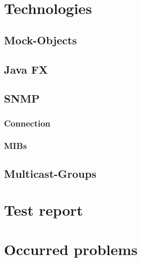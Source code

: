 \documentclass[11pt, a4paper]{article}
\begin{document}
\section{Technologies}
\subsection{Mock-Objects}
\subsection{Java FX}
\subsection{SNMP}
\subsubsection{Connection}
\subsubsection{MIBs}
\subsection{Multicast-Groups}

\section{Test report}
\section{Occurred problems}
{}

\end{document}
